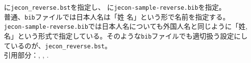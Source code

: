 \documentclass[10pt]{jarticle}
\begin{document}
\verb||に\verb|jecon_reverse.bst|を指定し、
\verb||に\verb|jecon-sample-reverse.bib|を指定。
\vspace{1em}\\
普通、\verb|bib|ファイルでは日本人名は「姓 名」という形で名前を指定する。
\verb|jecon-sample-reverse.bib|では日本人名についても外国人名と同じように「姓,
名」という形式で指定している。そのような\verb|bib|ファイルでも適切扱う設定にしているのが、\verb|jecon_reverse.bst|。
\vspace{1em}\\
引用部分：\citet{brezis93:_leapf_inter_compet},
\citet{ito85:_inte_trad}, \citet{brezis93:_leapf_inter_compet}.

\nocite{*}


% 


\end{document}
